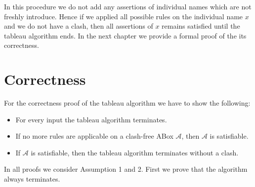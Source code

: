 \documentclass{book}
\theoremstyle{break}
\theoremstyle{definition}
\begin{document}
\begin{figure}[H]
\centering
{}
\end{figure}
In this procedure we do not add any assertions of individual names which are not freshly introduce. Hence if we applied all possible rules on the individual name $x$ and we do not have a clash, then all assertions of $x$ remains satisfied until the tableau algorithm ends. In the next chapter we provide a formal proof of the its correctness.
\chapter{Correctness}
For the correctness proof of the tableau algorithm we have to show the following:
\begin{itemize}
\item For every input the tableau algorithm terminates.
\item If no more rules are applicable on a clash-free ABox $\mathcal{A}$, then $\mathcal{A}$ is satisfiable.
\item If $\mathcal{A}$ is satisfiable, then the tableau algorithm terminates without a clash.
\end{itemize}
In all proofs we consider Assumption 1 and 2. First we prove that the algorithm always terminates.
\end{document}
